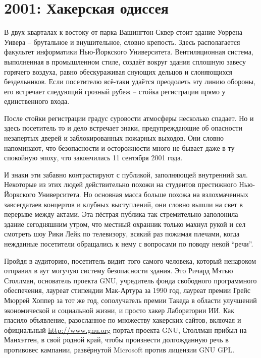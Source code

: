 
\chapter{2001: Хакерская одиссея}

В двух кварталах к востоку от парка Вашингтон-Сквер стоит здание Уоррена Уивера -- брутальное и внушительное, словно крепость. Здесь располагается факультет информатики Нью-Йоркского Университета. Вентиляционная система, выполненная в промышленном стиле, создаёт вокруг здания сплошную завесу горячего воздуха, равно обескураживая снующих дельцов и слоняющихся бездельников. Если посетителю всё-таки удаётся преодолеть эту линию обороны, его встречает следующий грозный рубеж -- стойка регистрации прямо у единственного входа.

После стойки регистрации градус суровости атмосферы несколько спадает. Но и здесь посетитель то и дело встречает знаки, предупреждающие об опасности незапертых дверей и заблокированных пожарных выходов. Они словно напоминают, что безопасности и осторожности много не бывает даже в ту спокойную эпоху, что закончилась 11 сентября 2001 года.

И знаки эти забавно контрастируют с публикой, заполняющей внутренний зал. Некоторые из этих людей действительно похожи на студентов престижного Нью-Йоркского Университета. Но основная масса больше похожа на взлохмаченных завсегдатаев концертов и клубных выступлений, они словно вышли на свет в перерыве между актами. Эта пёстрая публика так стремительно заполонила здание сегодняшним утром, что местный охранник только махнул рукой и сел смотреть шоу Рики Лейк по телевизору, всякий раз пожимая плечами, когда нежданные посетители обращались к нему с вопросами по поводу некой ``речи''.

Пройдя в аудиторию, посетитель видит того самого человека, который ненароком отправил в аут могучую систему безопасности здания. Это Ричард Мэтью Столлман, основатель проекта GNU, учредитель фонда свободного программного обеспечения, лауреат стипендии Мак-Артура за 1990 год, лауреат премии Грейс Мюррей Хоппер за тот же год, сополучатель премии Такеда в области улучшений экономической и социальной жизни, и просто хакер Лаборатории ИИ. Как гласило объявление, разосланное по множеству хакерских сайтов, включая и официальный \url{http://www.gnu.org} портал проекта GNU, Столлман прибыл на Манхэттен, в свой родной край, чтобы произнести долгожданную речь в противовес кампании, развёрнутой Microsoft против лицензии GNU GPL.

